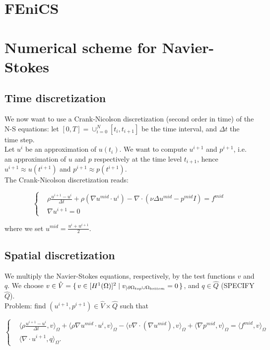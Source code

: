\documentclass[11pt,a4paper,titlepage]{report}
\begin{document}





\section{FEniCS}
\section{Numerical scheme for Navier-Stokes}

\subsection{Time discretization}
We now want to use a Crank-Nicolson discretization (second order in time) of the N-S equations: let $[0, T] = \cup^N_{i=0} [t_i, t_{i+1}] $ be the time interval, and $\Delta t$ the time step. \\
Let $u^i$ be an approximation of $u(t_i)$. We want to compute $u^{i+1}$ and $p^{i+1}$, i.e. an approximation of $u$ and $p$ respectively at the time level $t_{i+1}$, hence $u^{i+1} \approx u(t^{i+1})$ and $p^{i+1} \approx p(t^{i+1})$. \\
The Crank-Nicolson discretization reads:

\[
\left\{  
\begin{aligned}
& \rho \frac{u^{i+1} - u^i}{\Delta t} + \rho (\nabla u^{mid} \cdot u^i) - \nabla \cdot (\nu \Delta u^{mid} - p^{mid}I) = f^{mid} \\
& \nabla u^{i+1} = 0
\end{aligned}
\right.
\]

where we set $u^{mid} = \frac{u^i + u^{i+1}}{2}$.

\subsection{Spatial discretization}
We multiply the Navier-Stokes equations, respectively, by the test functions $v$ and $q$. We choose $v \in \hat{V} = \set{v \in [H^1(\Omega)]^2 | v_|{_{\partial \Omega_{top} \cup \Omega_{bottom}}} = 0}$, and $q \in \hat{Q}$ (SPECIFY $\hat{Q}$). \\
Problem: find $(u^{i+1}, p^{i+1}) \in \hat{V} \times \hat{Q}$ such that 

\[
\left\{  
\begin{aligned}
& \langle \rho \frac{u^{i+1} - u^i}{\Delta t},v \rangle_\Omega
+ \langle \rho \nabla u^{mid} \cdot u^i  ,v \rangle_\Omega
- \langle v \nabla \cdot (\nabla u^{mid}) ,v \rangle_\Omega
+ \langle \nabla p^{mid} ,v \rangle_\Omega = \langle f^{mid} ,v \rangle_\Omega \\
& \langle \nabla \cdot u^{i+1},q \rangle_\Omega.
\end{aligned}
\right.
\]
\end{document}
